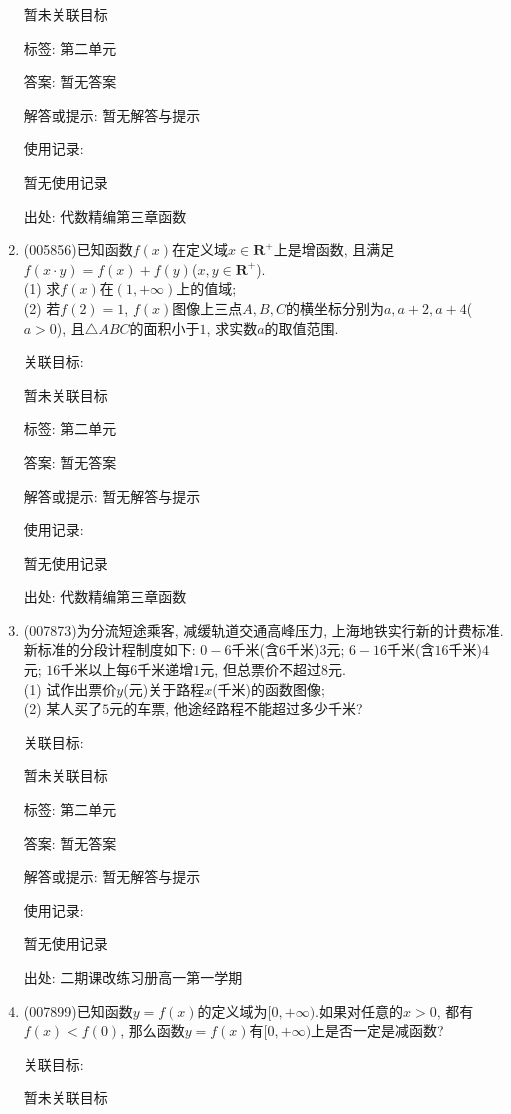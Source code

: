 \documentclass[10pt,a4paper]{article}
\begin{document}
\begin{enumerate}[1.]
暂未关联目标



标签: 第二单元

答案: 暂无答案

解答或提示: 暂无解答与提示

使用记录:

暂无使用记录


出处: 代数精编第三章函数
\item { (005856)}已知函数$f(x)$在定义域$x\in \mathbf{R}^+$上是增函数, 且满足$f(x\cdot y)=f(x)+f(y)$($x,y\in \mathbf{R}^+$).\\
(1) 求$f(x)$在$(1,+\infty)$上的值域;\\
(2) 若$f(2)=1$, $f(x)$图像上三点$A,B,C$的横坐标分别为$a,a+2,a+4$($a>0$), 且$\triangle ABC$的面积小于$1$, 求实数$a$的取值范围.


关联目标:

暂未关联目标



标签: 第二单元

答案: 暂无答案

解答或提示: 暂无解答与提示

使用记录:

暂无使用记录


出处: 代数精编第三章函数
\item { (007873)}为分流短途乘客, 减缓轨道交通高峰压力, 上海地铁实行新的计费标准. 新标准的分段计程制度如下: $0-6$千米(含$6$千米)$3$元; $6-16$千米(含$16$千米)$4$元; $16$千米以上每$6$千米递增$1$元, 但总票价不超过$8$元.\\
(1) 试作出票价$y$(元)关于路程$x$(千米)的函数图像;\\
(2) 某人买了$5$元的车票, 他途经路程不能超过多少千米?


关联目标:

暂未关联目标



标签: 第二单元

答案: 暂无答案

解答或提示: 暂无解答与提示

使用记录:

暂无使用记录


出处: 二期课改练习册高一第一学期
\item { (007899)}已知函数$y=f(x)$的定义域为$[0,+\infty)$.如果对任意的$x>0$, 都有$f(x)<f(0)$, 那么函数$y=f(x)$有$[0,+\infty)$上是否一定是减函数?


关联目标:

暂未关联目标




\end{enumerate}
\end{document}
